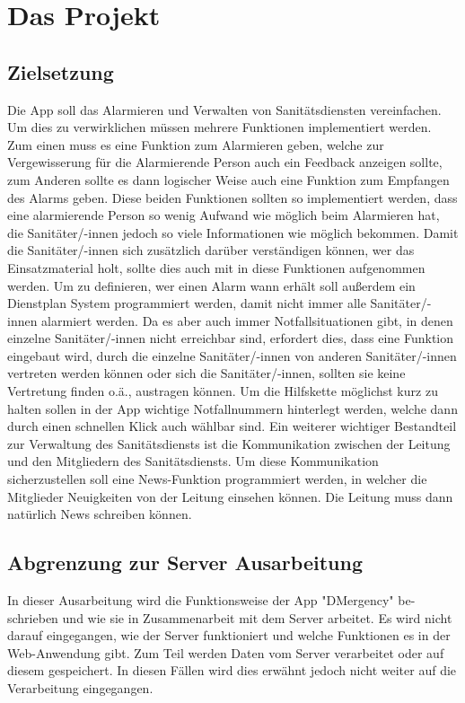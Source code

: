 \section{Das Projekt}
\subsection{Zielsetzung}
    Die App soll das Alarmieren und Verwalten von Sanitätsdiensten vereinfachen. Um dies zu verwirklichen müssen mehrere Funktionen
    implementiert werden. Zum einen muss es eine Funktion zum Alarmieren geben, welche zur Vergewisserung für die Alarmierende Person
    auch ein Feedback anzeigen sollte, zum Anderen sollte es dann logischer Weise auch eine Funktion zum Empfangen des Alarms geben.
    Diese beiden Funktionen sollten so implementiert werden, dass eine alarmierende Person so wenig Aufwand wie möglich beim Alarmieren hat,
    die Sanitäter/-innen jedoch so viele Informationen wie möglich bekommen. Damit die Sanitäter/-innen sich zusätzlich darüber verständigen können, 
    wer das Einsatzmaterial holt, sollte dies auch mit in diese Funktionen aufgenommen werden.
    Um zu definieren, wer einen Alarm wann erhält soll außerdem ein Dienstplan System programmiert werden, damit nicht immer alle Sanitäter/-innen
    alarmiert werden. Da es aber auch immer Notfallsituationen gibt, in denen einzelne Sanitäter/-innen nicht erreichbar sind, erfordert dies, 
    dass eine Funktion eingebaut wird, durch die einzelne Sanitäter/-innen von anderen Sanitäter/-innen vertreten werden können oder sich die Sanitäter/-innen, sollten 
    sie keine Vertretung finden o.ä., austragen können.
    Um die Hilfskette\cite{Rettungskette} möglichst kurz zu halten sollen in der App wichtige Notfallnummern hinterlegt werden, welche dann durch einen
    schnellen Klick auch wählbar sind.
    Ein weiterer wichtiger Bestandteil zur Verwaltung des Sanitätsdiensts ist die Kommunikation zwischen der Leitung und den Mitgliedern des Sanitätsdiensts.
    Um diese Kommunikation sicherzustellen soll eine News-Funktion programmiert werden, in welcher die Mitglieder Neuigkeiten von der Leitung einsehen können.
    Die Leitung muss dann natürlich News schreiben können.

\subsection{Abgrenzung zur Server Ausarbeitung}
    In dieser Ausarbeitung wird die Funktionsweise der App "DMergency" be-schrieben und wie sie in Zusammenarbeit mit dem 
    Server arbeitet. Es wird nicht darauf eingegangen, wie der Server funktioniert und welche Funktionen es in der Web-Anwendung gibt.
    Zum Teil werden Daten vom Server verarbeitet oder auf diesem gespeichert. In diesen Fällen wird dies erwähnt jedoch nicht weiter auf 
    die Verarbeitung eingegangen.